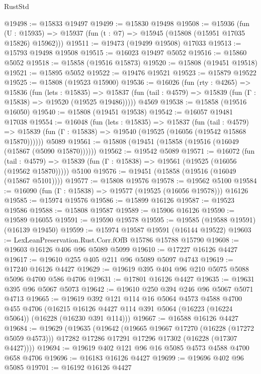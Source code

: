 \begin{lexlean}{RustStd}
\begin{coremodule}
@19498 := @15833 @19497
@19499 := @15830 @19498
@19508 := @15936
    (fun (U : @15935) => @15937 (fun (t : @7) => @15945 (@15808 (@15951 @17035 @15826) @15962)))
@19511 := @19473 (@19499 @19508) @17033
@19513 := @15793 @19498 @19508
@19515 := @16023 @19497 @5052
@19516 := @15860 @5052
@19518 := @15858 (@19516 @15873)
@19520 := @15808 (@19451 @19518)
@19521 := @15895 @5052
@19522 := @19476 @19521
@19523 := @15879 @19522
@19525 := @15808 (@19523 @15900)
@19536 := @16026
    (fun (rty : @4265) =>
    @15836
      (fun (lets : @15835) =>
      @15837 (fun (tail : @4579) => @15839 (fun (Γ : @15838) => @19520 (@19525 @19486)))))
    @4569
@19538 := @15858 (@19516 @16050)
@19540 := @15808 (@19451 @19538)
@19542 := @16057 @19481 @17038
@19554 := @16048
    (fun (lets : @15835) =>
    @15837
      (fun (tail : @4579) =>
      @15839 (fun (Γ : @15838) => @19540 (@19525 (@16056 (@19542 @15868 @15870))))))
    @5089
@19561 := @15808 (@19451 (@15858 (@19516 (@16049 (@15867 (@5090 @15870))))))
@19562 := @19542 @5089
@19571 := @16072
    (fun (tail : @4579) => @15839 (fun (Γ : @15838) => @19561 (@19525 (@16056 (@19562 @15870)))))
    @5100
@19576 := @19451 (@15858 (@19516 (@16049 (@15867 @5101))))
@19577 := @15808 @19576
@19578 := @19562 @5100
@19584 := @16090 (fun (Γ : @15838) => @19577 (@19525 (@16056 @19578))) @16126
@19585 := @15974 @19576
@19586 := @15899 @16126
@19587 := @19523 @19586
@19588 := @15808 @19587
@19589 := @15906 @16126
@19590 := @19589 @16055
@19591 := @19590 @19578
@19595 := @19585 (@19588 @19591) (@16139 @19450)
@19599 := @15974 @19587 @19591 (@16144 @19522)
@19603 := LexLeanPreservation.Rust.Corr.fOfB @15786 @15788 @15790
@19608 := @19603 @16126 @406 @96 @5089 @5099
@19610 := @17227 @16126 @4427
@19617 := @19610 @255 @405 @211 @96 @5089 @5097 @4743
@19619 := @17240 @16126 @4427
@19629 := @19619 @395 @404 @96 @210 @5075 @5088 @5096 @4700 @586 @4706
@19631 := @17801 @16126 @4427
@19635 := @19631 @395 @96 @5067 @5073
@19642 := @19610 @250 @394 @246 @96 @5067 @5071 @4713
@19665 := @19619
    @392
    @121
    @114
    @16
    @5064
    @4573
    @4588
    @4700
    @455
    @4706
    (@16215 @16126 @4427 @114 @391 @5064 (@16223 (@16224 @5064)) (@16228 (@16230 @391 @114)))
@19667 := @16588 @16126 @4427
@19684 := @19629
    (@19635
      (@19642
        (@19665 @19667 @17270 (@16228 (@17272 @5059 @4573)))
        @17282
        @17286
        @17291
        @17296
        @17302
        (@16228 (@17307 @4427))))
@19694 := @19619 @402 @121 @96 @16 @5085 @4573 @4588 @4700 @658 @4706
@19696 := @16183 @16126 @4427
@19699 := @19696 @402 @96 @5085
@19701 := @16192 @16126 @4427

\end{coremodule}
\end{lexlean}

